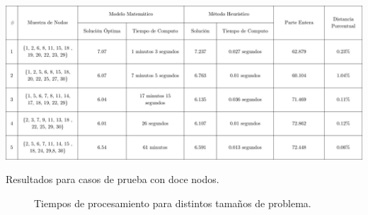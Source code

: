 \documentclass{amsart}
\begin{document}
            \begin{table}[ht]
                \centering
                \includegraphics[width=1\linewidth]{Sources/Tabla3.png}
                \caption{Resultados para casos de prueba con doce nodos.}\label{12nodos}
            \end{table}

            \begin{figure}[ht]
                \begin{center}
                    \caption{Tiempos de procesamiento para distintos tamaños de problema.}\label{GraficasTiemposProcesamiento}
                \end{center}
            \end{figure}
\end{document}
